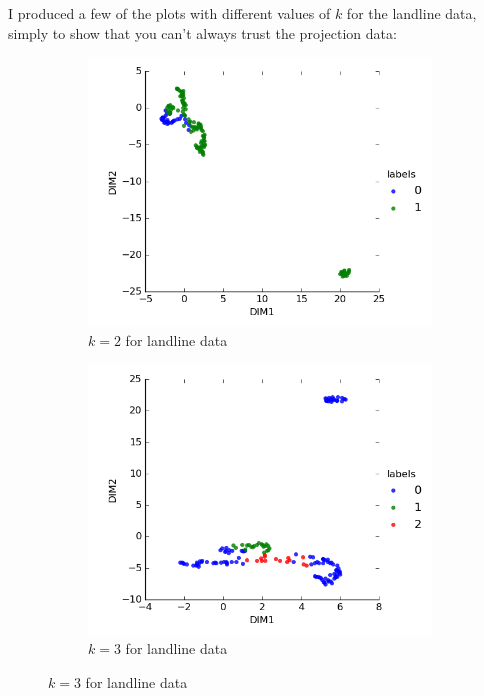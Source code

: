 \documentclass[20pt]{article} %
\begin{document}
\newpage
I produced a few of the plots with different values of $k$ for the landline data, simply to show that you can't always trust the projection data:
\begin{figure}[!htbp]
  	\centering
   	\begin{subfigure}[p]{0.45\linewidth}
    	\includegraphics[width=\linewidth]{../figures/redo/landline/ll_kmeans2.png}
	\caption{$k=2$ for landline data}
   	\end{subfigure}
   	\begin{subfigure}[p]{0.45\linewidth}
    	\includegraphics[width=\linewidth]{../figures/redo/landline/ll_kmeans3.png}
	\caption{$k=3$ for landline data}
   	\end{subfigure}
\end{figure} 
\end{document}
